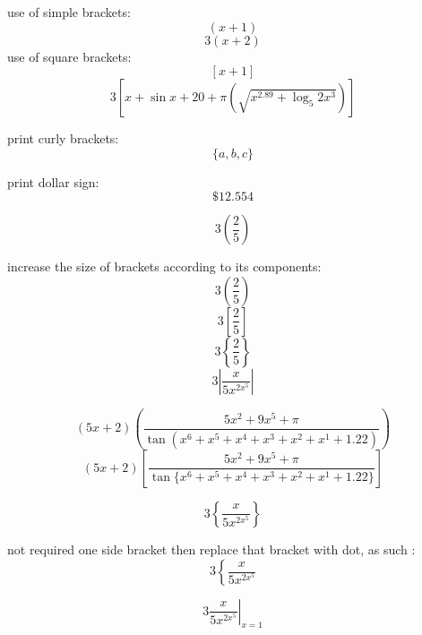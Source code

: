 \documentclass[11pt]{article}
\begin{document}
use of simple brackets:
$$(x+1)$$
$$3(x+2)$$
use of square brackets:
$$[x+1]$$
$$3[x+\sin{x+20}+\pi(\sqrt{x^{2.89}+\log_5{2x^3}})] $$

print curly brackets:
$$\{a,b,c\}$$

print dollar sign:
$$\$12.554$$

$$3(\frac{2}{5}) $$

increase the size of brackets according to its components:
$$3\left(\frac{2}{5}\right) $$
$$3\left[\frac{2}{5}\right] $$
$$3\left\{\frac{2}{5}\right\} $$
$$3\left|\frac{x}{5x^{2x^5}}\right| $$


$$(5x+2)\left(\frac{5x^2+9x^5+\pi}{\tan(x^6+x^5+x^4+x^3+x^2+x^1+1.22)}\right)$$
$$(5x+2)\left[\frac{5x^2+9x^5+\pi}{\tan\{x^6+x^5+x^4+x^3+x^2+x^1+1.22\}}\right]$$

$$3\left\{\frac{x}{5x^{2x^5}}\right\} $$

not required one side bracket then replace that bracket with dot, as such :
$$3\left\{\frac{x}{5x^{2x^5}}\right. $$

$$3\left.\frac{x}{5x^{2x^5}}\right|_{x=1} $$
\end{document}
